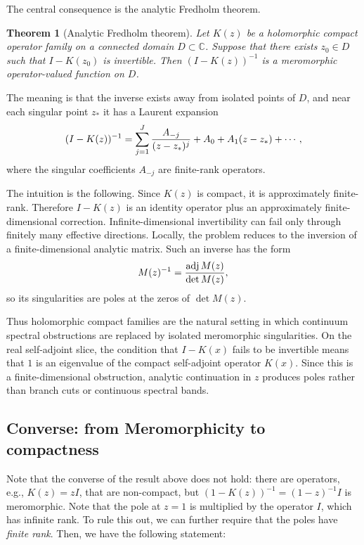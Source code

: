 \documentclass[JHEP,12pt]{article}
\newtheorem{theorem}[lemma]{Theorem}
\begin{document}
The central consequence is the analytic Fredholm theorem.

\begin{theorem}[Analytic Fredholm theorem]
Let \(K(z)\) be a holomorphic compact operator family on a connected domain
\(D\subset\mathbb C\). Suppose that there exists \(z_0\in D\) such that
$I-K(z_0)$
is invertible. Then
$(I-K(z))^{-1}$
is a meromorphic operator-valued function on \(D\).
\end{theorem}

The meaning is that the inverse exists away from isolated points of \(D\), and
near each singular point \(z_\ast\) it has a Laurent expansion
\[
(I-K(z))^{-1}
=
\sum_{j=1}^{J}{A_{-j}\over (z-z_\ast)^j}
+
A_0+A_1(z-z_\ast)+\cdots ,
\]
where the singular coefficients \(A_{-j}\) are finite-rank operators.

The intuition is the following. Since \(K(z)\) is compact, it is approximately
finite-rank. Therefore \(I-K(z)\) is an identity operator plus an
approximately finite-dimensional correction. Infinite-dimensional invertibility
can fail only through finitely many effective directions. Locally, the problem
reduces to the inversion of a finite-dimensional analytic matrix. Such an
inverse has the form
\[
M(z)^{-1}={\operatorname{adj}M(z)\over \det M(z)} ,
\]
so its singularities are poles at the zeros of \(\det M(z)\).

Thus holomorphic compact families are the natural setting in which continuum
spectral obstructions are replaced by isolated meromorphic singularities.
On the real self-adjoint slice, the condition that \(I-K(x)\) fails to be
invertible means that \(1\) is an eigenvalue of the compact self-adjoint
operator \(K(x)\). Since this is a finite-dimensional obstruction, analytic
continuation in \(z\) produces poles rather than branch cuts or continuous
spectral bands.

\subsection{Converse: from Meromorphicity to compactness}

Note that the converse of the result above does not hold: there are operators, e.g., $K(z)=z I$, that are non-compact, but $(1-K(z))^{-1}=(1-z)^{-1}I$ is meromorphic. Note that the pole at $z=1$ is multiplied by the operator $I$, which has infinite rank. To rule this out, we can further require that the poles have {\it finite rank}. Then, we have the following statement:
\end{document}
